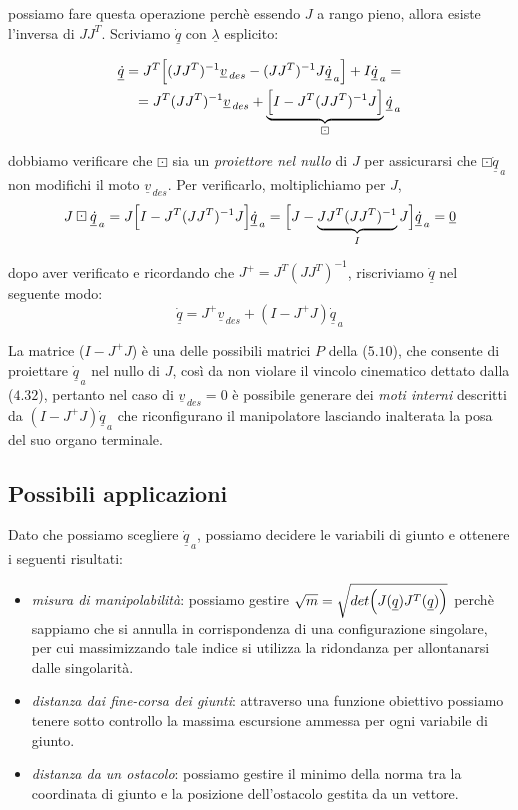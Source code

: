 possiamo fare questa operazione perchè essendo $J$ a rango pieno, allora esiste l'inversa di $JJ^T$. Scriviamo $\underline{\dot{q}}$ con $\underline{\lambda}$ esplicito:

\begin{eqnarray*}
	\underline{\dot{q}} = J^T \Bigl[ (JJ^T)^{-1}\underline{v}_{\,des} - (JJ^T)^{-1}J \underline{\dot{q}}_{\,a} \Bigr] + I \underline{\dot{q}}_{\,a} = \\
	= J^T (JJ^T)^{-1}\underline{v}_{\,des} + \underbrace{\Bigl[ I - J^T(JJ^T)^{-1}J \Bigr]}_{\boxdot} \underline{\dot{q}}_{\,a}
\end{eqnarray*}

dobbiamo verificare che $\boxdot$ sia un \emph{proiettore nel nullo} di $J$ per assicurarsi che $\boxdot\underline{\dot{q}}_{\,a}$ non modifichi il moto $\underline{v}_{\,des}$. Per verificarlo, moltiplichiamo per $J$,
\begin{equation}
	J\boxdot\underline{\dot{q}}_{\,a} = J\Bigl[ I - J^T(JJ^T)^{-1}J \Bigr]\underline{\dot{q}}_{\,a} = \Bigl[ J - \underbrace{JJ^T(JJ^T)^{-1}}_{I}J \Bigr] \underline{\dot{q}}_{\,a} = \underline{0}
\end{equation}

dopo aver verificato e ricordando che $J^{+} = J^T(JJ^T)^{-1}$, riscriviamo $\underline{\dot{q}}$ nel seguente modo:
\begin{equation}
	\underline{\dot{q}} = J^{+} \underline{v}_{\,des} + (I - J^{+}J) \underline{\dot{q}}_{\,a}
\end{equation}

La matrice ($I - J^{+}J$) è una delle possibili matrici $P$ della ($5.10$), che consente di proiettare $\underline{\dot{q}}_{\,a}$ nel nullo di $J$, così da non violare il vincolo cinematico dettato dalla ($4.32$), pertanto nel caso di $\underline{v}_{\,des} = 0$ è possibile generare dei \emph{moti interni} descritti da $(I-J^+J)\underline{\dot{q}}_{\,a}$ che riconfigurano il manipolatore lasciando inalterata la posa del suo organo terminale.

\subsection{Possibili applicazioni}
Dato che possiamo scegliere $\underline{\dot{q}}_{\,a}$, possiamo decidere le variabili di giunto e ottenere i seguenti risultati:
\begin{itemize}
	\item \emph{misura di manipolabilità}: possiamo gestire $\sqrt{m} = \sqrt{det\Bigl(J(\underline{q})J^{T}(\underline{q})\Bigr)}$ perchè sappiamo che si annulla in corrispondenza di una configurazione singolare, per cui massimizzando tale indice si utilizza la ridondanza per allontanarsi dalle singolarità. 
	\item \emph{distanza dai fine-corsa dei giunti}: attraverso una funzione obiettivo possiamo tenere sotto controllo la massima escursione ammessa per ogni variabile di giunto.
	\item \emph{distanza da un ostacolo}: possiamo gestire il minimo della norma tra la coordinata di giunto e la posizione dell'ostacolo gestita da un vettore.
\end{itemize}

